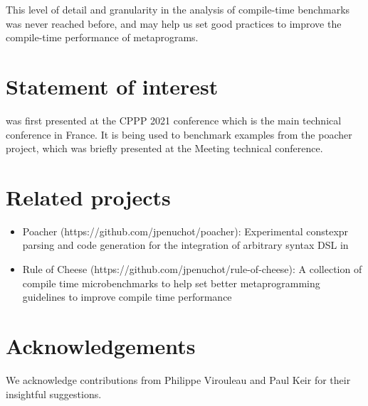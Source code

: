 \documentclass[../../main.tex]{subfiles}
\begin{document}
This level of detail and granularity in the analysis of compile-time benchmarks
was never reached before, and may help us set good practices to improve the
compile-time performance of metaprograms.

\section{Statement of interest} %

\ctbench was first presented at the CPPP 2021 conference\cite{ctbench-cppp21}
which is the main \cpp technical conference in France. It is being used to
benchmark examples from the poacher\cite{poacher} project, which was briefly
presented at the Meeting \cite{meetingcpp22} technical conference.

\section{Related projects} %

\begin{itemize}

\item Poacher (https://github.com/jpenuchot/poacher): Experimental constexpr
      parsing and code generation for the integration of arbitrary syntax DSL in

\item Rule of Cheese (https://github.com/jpenuchot/rule-of-cheese):
      A collection of compile time microbenchmarks to help set better
      \cpp metaprogramming guidelines to improve compile time performance
\end{itemize}

\section{Acknowledgements}

We acknowledge contributions from Philippe Virouleau and Paul Keir for their
insightful suggestions.
\end{document}
